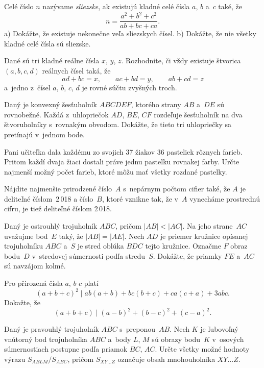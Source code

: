 {%
Celé číslo $n$ nazývame {\it sliezske}, ak existujú kladné celé čísla $a$, $b$ a~$c$ také, že
$$
n=\frac {a^2 + b^2 + c^2}{ab + bc + ca}.
$$
\ite a) Dokážte, že existuje nekonečne veľa sliezskych čísel.
\ite b) Dokážte, že nie všetky kladné celé čísla sú sliezske.
}

{%
Dané sú tri kladné reálne čísla $x$, $y$, $z$. Rozhodnite, či vždy existuje štvorica $(a,b,c,d)$ reálnych čísel taká, že
$$
ad+bc=x,\qquad ac+bd=y,\qquad ab+cd=z
$$
a~jedno z~čísel $a$, $b$, $c$, $d$ je rovné súčtu zvyšných troch.}

{%
Daný je konvexný šesťuholník $ABCDEF$, ktorého strany $AB$ a~$DE$ sú rovnobežné. Každá z~uhlopriečok $AD$, $BE$, $CF$ rozdeľuje šesťuholník na dva štvoruholníky s~rovnakým obvodom. Dokážte, že tieto tri uhlopriečky sa pretínajú v~jednom bode.
}

{%
Pani učiteľka dala každému zo svojich 37 žiakov 36 pasteliek rôznych farieb. Pritom každí dvaja žiaci dostali práve jednu pastelku rovnakej farby. Určte najmenší možný počet farieb, ktoré môžu mať všetky rozdané pastelky.
}

{%
Nájdite najmenšie prirodzené číslo~$A$ s~nepárnym počtom cifier také, že $A$ je deliteľné číslom~2\,018 a číslo~$B$, ktoré vznikne tak, že v~$A$ vynecháme prostrednú cifru, je tiež deliteľné číslom 2\,018.
}

{%
Daný je ostrouhlý trojuholník $ABC$, pričom $|AB| < |AC|$. Na jeho strane~$AC$ uvažujme bod~$E$ taký, že $|AB| = |AE|$. Nech $AD$ je priemer kružnice opísanej trojuholníku $ABC$ a~$S$ je stred oblúka $BDC$ tejto kružnice. Označme $F$ obraz bodu~$D$ v~stredovej súmernosti podľa stredu~$S$. Dokážte, že priamky $FE$ a~$AC$ sú navzájom kolmé.
}

{%
Pro přirozená čísla $a$, $b$ $c$ platí
$$
(a+b+c)^2\mid ab(a+b)+bc(b+c)+ca(c+a)+3abc.
$$
Dokažte, že
$$
(a+b+c)\mid (a-b)^2+(b-c)^2+(c-a)^2.
$$
}

{%
Daný je pravouhlý trojuholník $ABC$ s~preponou~$AB$. Nech $K$ je ľubovoľný vnútorný bod trojuholníka $ABC$ a~body $L$, $M$ sú obrazy bodu~$K$ v~osových súmernostiach postupne podľa priamok $BC$, $AC$. Určte všetky možné hodnoty výrazu $S_{ABLM}/S_{ABC}$, pričom $S_{XY\!\dots{}Z}$ označuje obsah mnohouholníka $XY\!\dots{}Z$.
}

